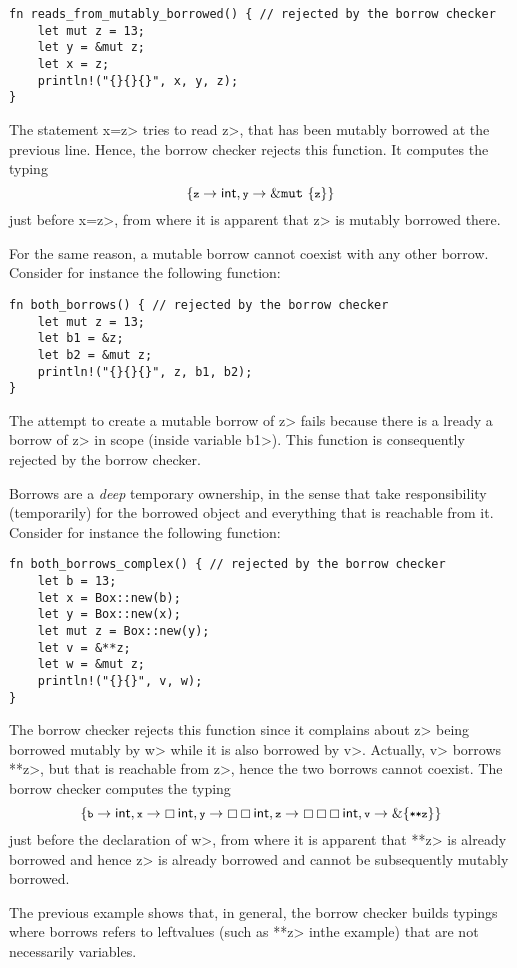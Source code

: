 \begin{verbatim}
fn reads_from_mutably_borrowed() { // rejected by the borrow checker
    let mut z = 13;
    let y = &mut z;
    let x = z;
    println!("{}{}{}", x, y, z);
}
\end{verbatim}

\noindent
The statement \<x=z> tries to read \<z>, that has been mutably borrowed
at the previous line. Hence, the borrow checker rejects this function.
It computes the typing
\[
\{\<z>\to\mathsf{int},\<y>\to\mutborrow\{\<z>\}\}
\]
just before \<x=z>, from where it is apparent that \<z> is mutably borrowed there.

For the same reason, a mutable borrow cannot coexist with any other borrow. Consider for instance
the following function:

\begin{verbatim}
fn both_borrows() { // rejected by the borrow checker
    let mut z = 13;
    let b1 = &z;
    let b2 = &mut z;
    println!("{}{}{}", z, b1, b2);
}
\end{verbatim}

\noindent
The attempt to create a mutable borrow of \<z> fails because there is a lready a borrow of \<z>
in scope (inside variable \<b1>). This function is consequently rejected by the borrow checker.

Borrows are a \emph{deep} temporary ownership, in the sense that take
responsibility (temporarily) for the borrowed object and everything that is reachable from it.
Consider for instance the following function:

\begin{verbatim}
fn both_borrows_complex() { // rejected by the borrow checker
    let b = 13;
    let x = Box::new(b);
    let y = Box::new(x);
    let mut z = Box::new(y);
    let v = &**z;
    let w = &mut z;
    println!("{}{}", v, w);
}
\end{verbatim}

\noindent
The borrow checker rejects this function since it complains about
\<z> being borrowed mutably by \<w> while it is also borrowed by \<v>.
Actually, \<v> borrows \<**z>, but that is reachable from \<z>, hence
the two borrows cannot coexist.
The borrow checker computes the typing
\[
\{\<b>\to\mathsf{int},\<x>\to\boxtype{\mathsf{int}},\<y>\to\boxtype{\boxtype{\mathsf{int}}},
\<z>\to\boxtype{\boxtype{\boxtype{\mathsf{int}}}},\<v>\to\borrow\{\<**z>\}\}
\]
just before the declaration of \<w>, from where it is apparent that \<**z> is
already borrowed and hence \<z> is already borrowed and cannot be subsequently mutably borrowed.

The previous example shows that, in general, the borrow checker builds typings
where borrows refers to leftvalues (such as \<**z> inthe example) that are not necessarily variables.
